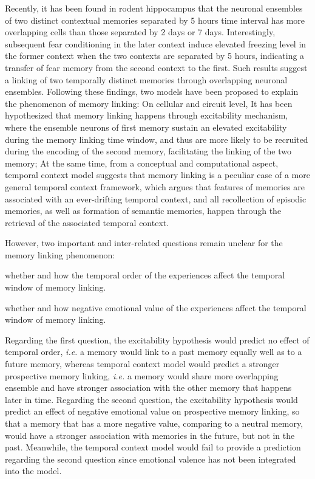 \documentclass[master.tex]{subfiles}
\begin{document}
Recently, it has been found in rodent hippocampus that the neuronal ensembles of
two distinct contextual memories separated by 5 hours time interval has more
overlapping cells than those separated by 2 days or 7 days. Interestingly,
subsequent fear conditioning in the later context induce elevated freezing level
in the former context when the two contexts are separated by 5 hours, indicating
a transfer of fear memory from the second context to the first. Such results
suggest a linking of two temporally distinct memories through overlapping
neuronal ensembles. Following these findings, two models have been proposed to
explain the phenomenon of memory linking: On cellular and circuit level, It has
been hypothesized that memory linking happens through excitability mechanism,
where the ensemble neurons of first memory sustain an elevated excitability
during the memory linking time window, and thus are more likely to be recruited
during the encoding of the second memory, facilitating the linking of the two
memory; At the same time, from a conceptual and computational aspect, temporal
context model suggests that memory linking is a peculiar case of a more general
temporal context framework, which argues that features of memories are
associated with an ever-drifting temporal context, and all recollection of
episodic memories, as well as formation of semantic memories, happen through the
retrieval of the associated temporal context.

However, two important and inter-related questions remain unclear for the memory
linking phenomenon:
\begin{inparaenum}[a)] \bfseries
\item whether and how the temporal order of the experiences affect the temporal
  window of memory linking.
\item whether and how negative emotional value of the experiences affect the
  temporal window of memory linking.
\end{inparaenum}
Regarding the first question, the excitability hypothesis would predict no
effect of temporal order, \textit{i.e.} a memory would link to a past memory
equally well as to a future memory, whereas temporal context model would predict
a stronger prospective memory linking, \textit{i.e.} a memory would share more
overlapping ensemble and have stronger association with the other memory that
happens later in time. Regarding the second question, the excitability
hypothesis would predict an effect of negative emotional value on prospective
memory linking, so that a memory that has a more negative value, comparing to a
neutral memory, would have a stronger association with memories in the future,
but not in the past. Meanwhile, the temporal context model would fail to provide
a prediction regarding the second question since emotional valence has not been
integrated into the model.
\end{document}
